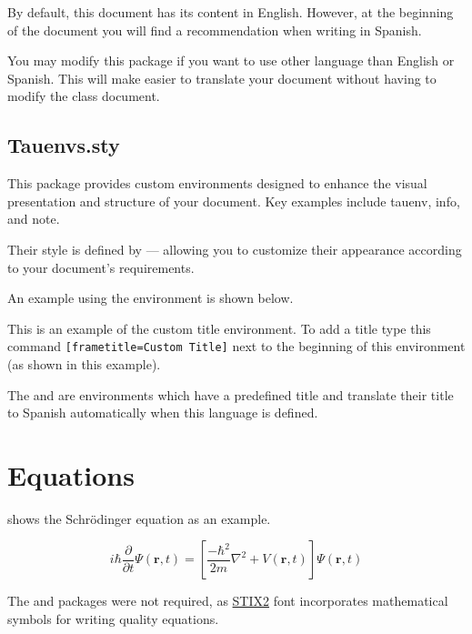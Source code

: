 \documentclass[9pt,a4paper,twocolumn,twoside]{tau-class/tau}
\begin{document}
		By default, this document has its content in English. However, at the beginning of the document you will find a recommendation when writing in Spanish. 
		
		You may modify this package if you want to use other language than English or Spanish. This will make easier to translate your document without having to modify the class document.

	\subsection{Tauenvs.sty}

        This package provides custom environments designed to enhance the visual presentation and structure of your document. Key examples include tauenv, info, and note.
        
		Their style is defined by  — allowing you to customize their appearance according to your document’s requirements.

		An example using the  environment is shown below.
		
		\begin{tauenv}[frametitle=Custom Title]
			This is an example of the custom title environment. To add a title type this command \verb|[frametitle=Custom Title]| next to the beginning of this environment (as shown in this example).
		\end{tauenv}

        The  and  are environments which have a predefined title and translate their title to Spanish automatically when this language is defined.

\section{Equations}

	 shows the Schrödinger equation as an example. 

    \begin{equation}\label{eq:equation}
        i\hbar \frac{\partial }{\partial t}\Psi(\mathbf{r},t) = \left[\frac{-\hbar^2}{2m}\nabla^2 + V(\mathbf{r},t) \right]\Psi(\mathbf{r},t)
    \end{equation}
	
	The  and  packages were not required, as \href{https://ctan.org/pkg/stix2-otf/}{STIX2} font incorporates mathematical symbols for writing quality equations.
	
\end{document}
